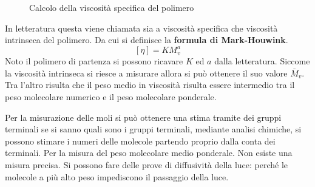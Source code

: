 \begin{figure}
\centering
{}\quad
{}
\caption{Calcolo della viscosità specifica del polimero}
\label{def:ViscSpec}
\end{figure}
In letteratura questa viene chiamata sia a viscosità specifica che viscosità intrinseca del polimero.
Da cui si definisce la \textbf{formula di Mark-Houwink}.
\begin{equation}
\left[\eta\right] = KM_v^a
\label{eqn:MarkHounwink}
\end{equation}
Noto il polimero di partenza si possono ricavare $K$ ed $a$ dalla letteratura.
Siccome la viscosità intrinseca si riesce a misurare allora si può ottenere il suo valore $\bar{M}_v$. Tra l'altro risulta che il peso medio in viscosità risulta essere intermedio tra il peso molecolare numerico e il peso molecolare ponderale.

Per la misurazione delle moli si può ottenere una stima tramite dei gruppi terminali se si sanno quali sono i gruppi terminali, mediante analisi chimiche, si possono stimare i numeri delle molecole partendo proprio dalla conta dei terminali.
Per la misura del peso molecolare medio ponderale. Non esiste una misura precisa. Si possono fare delle prove di diffusività della luce: perché le molecole a più alto peso impediscono il passaggio della luce.

